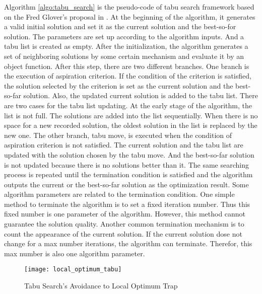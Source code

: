 		Algorithm \ref{algo:tabu_search} is the pseudo-code of tabu search framework based on the Fred Glover's proposal in \cite{doi:10.1287/ijoc.1.3.190}. 
		At the beginning of the algorithm, it generates a valid initial solution and set it as the current solution and the best-so-for solution. The parameters are set up according to the algorithm inputs. And a tabu list is created as empty.
		After the initialization, the algorithm generates a set of neighboring solutions by some certain mechanism and evaluate it by an object function. After this step, there are two different branches.
		One branch is the execution of aspiration criterion. If the condition of the criterion is satisfied, the solution selected by the
		criterion is set as the current solution and the best-so-far solution. Also, the updated current solution is added to the tabu
		list. There are two cases for the tabu list updating. At the early stage of the algorithm, the list is not full. The solutions are added into the list sequentially. When there is no space for a new recorded solution, the oldest solution in the list is replaced by the new one.
		The other branch, tabu move, is executed when the condition of aspiration criterion is not satisfied. The current solution and the tabu list are updated with the solution chosen by the tabu move. And the best-so-far solution is not updated because there is no solutions better than it.
		The same searching process is repeated until the termination condition is satisfied and the algorithm outputs the current or the best-so-far solution as the optimization result. Some algorithm parameters are related to the termination condition. One simple
		method to terminate the algorithm is to set a fixed iteration number. Thus this fixed number is one parameter of the algorithm. However, this method cannot guarantee the solution quality. Another common termination mechanism is to count the appearance of the current solution. If the current solution dose not change for a max number iterations, the algorithm can terminate. Therefor,
		this max number is also one algorithm parameter.

		\begin{figure}[H]
			\begin{center}
				\texttt{[image: local\_optimum\_tabu]}
				\caption[Tabu Search's Avoidance to Local Optimum Trap]{Tabu Search's Avoidance to Local Optimum Trap}
				\label{fig:local_optimum_tabu}
			\end{center}
		\end{figure}

